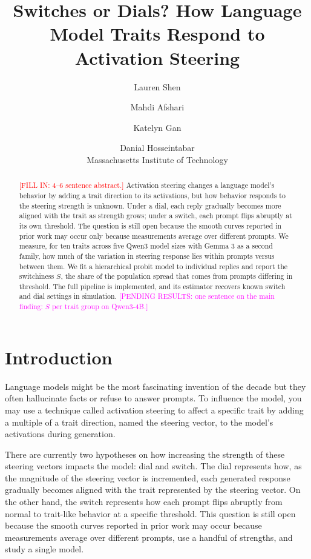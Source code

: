 \documentclass[11pt]{article}
\title{Switches or Dials? How Language Model Traits Respond to Activation Steering}
\author{Lauren Shen \and Mahdi Afshari \and Katelyn Gan \and Danial Hosseintabar \\
Massachusetts Institute of Technology}
\date{}
\newcommand{\fillin}[1]{\textcolor{red}{[FILL IN: #1]}}
\newcommand{\upd}[1]{{\color{updgreen}#1}}
\newcommand{\pending}[1]{\textcolor{magenta}{[PENDING RESULTS: #1]}}
\begin{document}
\maketitle

\begin{abstract}
\fillin{4--6 sentence abstract.}
\upd{Activation steering changes a language model's behavior by adding a trait
direction to its activations, but how behavior responds to the steering strength
is unknown. Under a dial, each reply gradually becomes more aligned with the
trait as strength grows; under a switch, each prompt flips abruptly at its own
threshold. The question is still open because the smooth curves reported in prior
work may occur only because measurements average over different prompts. We
measure, for ten traits across five Qwen3 model sizes with Gemma 3 as a second
family, how much of the variation in steering response lies within prompts
versus between them. We fit a hierarchical probit model to individual replies and
report the switchiness $S$, the share of the population spread that comes from
prompts differing in threshold. The full pipeline is implemented, and its
estimator recovers known switch and dial settings in simulation.}
\pending{one sentence on the main finding: $S$ per trait group on Qwen3-4B.}
\end{abstract}

\section{Introduction}

Language models might be the most fascinating invention of the decade but they often
hallucinate facts or refuse to answer prompts. To influence the model, you may use a
technique called activation steering to affect a specific trait \cite{chen2025persona}
\upd{by adding a multiple of a trait direction, named the steering vector, to the
model's activations during generation.}

There are currently two hypotheses on how increasing the strength of these steering
vectors impacts the model: dial and switch. The dial represents how, as the magnitude
of the steering vector is incremented, each generated response gradually becomes
aligned with the trait represented by the steering vector. On the other hand, the
switch represents how each prompt flips abruptly from normal to trait-like behavior at
a specific threshold. This question is still open because the smooth curves reported
in prior work may occur because measurements average over different prompts, use a
handful of strengths, and study a single model.
\end{document}
